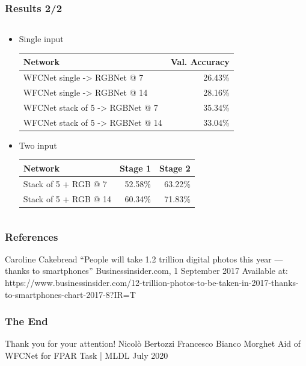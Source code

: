 \documentclass{beamer}
\begin{document}
\begin{frame}
	\frametitle{Results 2/2}
	
	{ \footnotesize 
		\begin{columns}[c]
			\begin{column}{\textwidth}
				\begin{itemize}
					\item Single input \\
					\vspace*{8pt}
					\begin{tabular}{l|r}
						Network & Val. Accuracy \\
						\hline
						WFCNet single -> RGBNet @ 7 & 26.43\% \\
						WFCNet single -> RGBNet @ 14 & 28.16\% \\
						\hline
						WFCNet stack of 5 -> RGBNet @ 7 & 35.34\% \\
						WFCNet stack of 5 -> RGBNet @ 14 & 33.04\% \\
					\end{tabular}
					\item Two input \\
					\vspace*{8pt}
					\begin{tabular}{l|rr}
						Network & Stage 1 & Stage 2 \\
						\hline
						Stack of 5 + RGB @ 7 & 52.58\% & 63.22\% \\
						Stack of 5 + RGB @ 14 & 60.34\% & 71.83\% \\
					\end{tabular}
				\end{itemize}
			\end{column}
		\end{columns}
	}
	
\end{frame}
     
\begin{frame}
\frametitle{References}
   \begin{thebibliography}{9}
		Caroline Cakebread
		\newblock “People will take 1.2 trillion digital photos this year — thanks to smartphones”
		\newblock Businessinsider.com, 1 September 2017
		\newblock Available at: https://www.businessinsider.com/12-trillion-photos-to-be-taken-in-2017-thanks-to-smartphones-chart-2017-8?IR=T
   \end{thebibliography}
\end{frame}

\begin{frame}
\centering
\frametitle{The End}
\Huge Thank you for your attention!
\break
\break
\break
\break
\large Nicolò Bertozzi
\break
Francesco Bianco Morghet
\break
\break
Aid of WFCNet for FPAR Task | MLDL
 July 2020
\end{frame}
\end{document}

